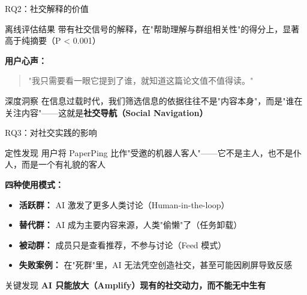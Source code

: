 \documentclass[UTF8,aspectratio=169]{ctexbeamer}
\begin{document}
\begin{frame}{RQ2：社交解释的价值}
\begin{block}{离线评估结果}
带有社交信号的解释，在"帮助理解与群组相关性"的得分上，显著高于纯摘要（P < 0.001）
\end{block}

\vspace{0.3cm}

\textbf{用户心声：}
\begin{quote}
"我只需要看一眼它提到了谁，就知道这篇论文值不值得读。"
\end{quote}

\vspace{0.3cm}

\begin{alertblock}{深度洞察}
在信息过载时代，我们筛选信息的依据往往不是"内容本身"，而是\textcolor{myblue}{"谁在关注内容"}——这就是\textbf{社交导航（Social Navigation）}
\end{alertblock}
\end{frame}

\begin{frame}{RQ3：对社交实践的影响}
\begin{block}{定性发现}
用户将 PaperPing 比作\textcolor{myblue}{"受邀的机器人客人"}——它不是主人，也不是仆人，而是一个有礼貌的客人
\end{block}

\vspace{0.3cm}

\textbf{四种使用模式：}
\begin{itemize}
\item \textbf{活跃群：} AI 激发了更多人类讨论（Human-in-the-loop）
\item \textbf{替代群：} AI 成为主要内容来源，人类"偷懒"了（任务卸载）
\item \textbf{被动群：} 成员只是查看推荐，不参与讨论（Feed 模式）
\item \textbf{失败案例：} 在"死群"里，AI 无法凭空创造社交，甚至可能因刷屏导致反感
\end{itemize}

\vspace{0.3cm}

\begin{alertblock}{关键发现}
\textbf{AI 只能放大（Amplify）现有的社交动力，而不能无中生有}
\end{alertblock}
\end{frame}
\end{document}
